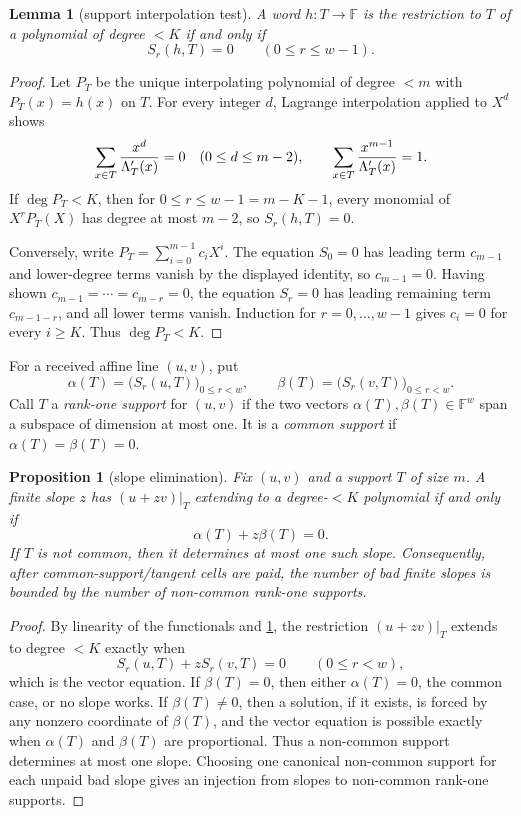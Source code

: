 \documentclass[11pt]{article}
\newtheorem{lemma}[lemma]{Lemma}
\newtheorem{proposition}[proposition]{Proposition}
\theoremstyle{definition}
\theoremstyle{remark}
\newcommand{\F}{\mathbb{F}}
\begin{document}
\begin{lemma}[support interpolation test]\label{lem:capfr1-interpolation-test}
A word \(h:T\to\F\) is the restriction to \(T\) of a polynomial of degree \(<K\) if and only if
\[
        S_r(h,T)=0\qquad(0\le r\le w-1).
\]
\end{lemma}

\begin{proof}
Let \(P_T\) be the unique interpolating polynomial of degree \(<m\) with \(P_T(x)=h(x)\) on \(T\).  For every integer \(d\), Lagrange interpolation applied to \(X^d\) shows
\[
        \sum_{x\in T}{x^d\over\Lambda_T'(x)}=0\quad(0\le d\le m-2),
        \qquad
        \sum_{x\in T}{x^{m-1}\over\Lambda_T'(x)}=1.
\]
If \(\deg P_T<K\), then for \(0\le r\le w-1=m-K-1\), every monomial of \(X^rP_T(X)\) has degree at most \(m-2\), so \(S_r(h,T)=0\).

Conversely, write \(P_T=\sum_{i=0}^{m-1}c_iX^i\).  The equation \(S_0=0\) has leading term \(c_{m-1}\) and lower-degree terms vanish by the displayed identity, so \(c_{m-1}=0\).  Having shown \(c_{m-1}=\cdots=c_{m-r}=0\), the equation \(S_r=0\) has leading remaining term \(c_{m-1-r}\), and all lower terms vanish.  Induction for \(r=0,\ldots,w-1\) gives \(c_i=0\) for every \(i\ge K\).  Thus \(\deg P_T<K\).
\end{proof}

For a received affine line \((u,v)\), put
\[
        \alpha(T)=\bigl(S_r(u,T)\bigr)_{0\le r<w},
        \qquad
        \beta(T)=\bigl(S_r(v,T)\bigr)_{0\le r<w}.
\]
Call \(T\) a \emph{rank-one support} for \((u,v)\) if the two vectors \(\alpha(T),\beta(T)\in\F^w\) span a subspace of dimension at most one.  It is a \emph{common support} if \(\alpha(T)=\beta(T)=0\).

\begin{proposition}[slope elimination]\label{prop:capfr1-slope-elimination}
Fix \((u,v)\) and a support \(T\) of size \(m\).  A finite slope \(z\) has \((u+zv)|_T\) extending to a degree-\(<K\) polynomial if and only if
\[
        \alpha(T)+z\beta(T)=0.
\]
If \(T\) is not common, then it determines at most one such slope.  Consequently, after common-support/tangent cells are paid, the number of bad finite slopes is bounded by the number of non-common rank-one supports.
\end{proposition}

\begin{proof}
By linearity of the functionals and \cref{lem:capfr1-interpolation-test}, the restriction \((u+zv)|_T\) extends to degree \(<K\) exactly when
\[
        S_r(u,T)+zS_r(v,T)=0
        \qquad(0\le r<w),
\]
which is the vector equation.  If \(\beta(T)=0\), then either \(\alpha(T)=0\), the common case, or no slope works.  If \(\beta(T)\ne0\), then a solution, if it exists, is forced by any nonzero coordinate of \(\beta(T)\), and the vector equation is possible exactly when \(\alpha(T)
\) and \(\beta(T)\) are proportional.  Thus a non-common support determines at most one slope.  Choosing one canonical non-common support for each unpaid bad slope gives an injection from slopes to non-common rank-one supports.
\end{proof}
\end{document}

